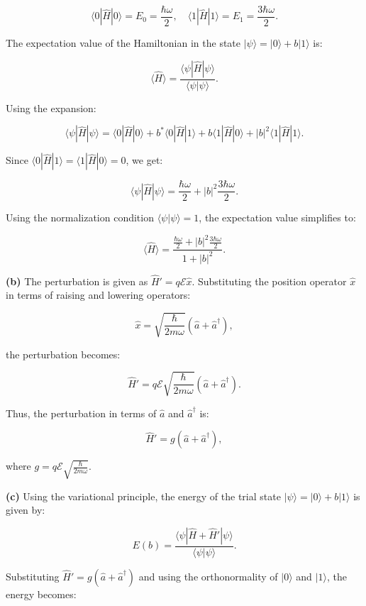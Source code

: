 \documentclass{article}
\begin{document}
\[
\langle 0 | \hat{H} | 0 \rangle = E_0 = \frac{\hbar \omega}{2}, \quad \langle 1 | \hat{H} | 1 \rangle = E_1 = \frac{3 \hbar \omega}{2}.
\]

The expectation value of the Hamiltonian in the state \(|\psi\rangle = |0\rangle + b|1\rangle\) is:

\[
\langle \hat{H} \rangle = \frac{\langle \psi | \hat{H} | \psi \rangle}{\langle \psi | \psi \rangle}.
\]

Using the expansion:

\[
\langle \psi | \hat{H} | \psi \rangle = \langle 0 | \hat{H} | 0 \rangle + b^* \langle 0 | \hat{H} | 1 \rangle + b \langle 1 | \hat{H} | 0 \rangle + |b|^2 \langle 1 | \hat{H} | 1 \rangle.
\]

Since \(\langle 0 | \hat{H} | 1 \rangle = \langle 1 | \hat{H} | 0 \rangle = 0\), we get:

\[
\langle \psi | \hat{H} | \psi \rangle = \frac{\hbar \omega}{2} + |b|^2 \frac{3 \hbar \omega}{2}.
\]

Using the normalization condition \(\langle \psi | \psi \rangle = 1\), the expectation value simplifies to:

\[
\langle \hat{H} \rangle = \frac{\frac{\hbar \omega}{2} + |b|^2 \frac{3 \hbar \omega}{2}}{1 + |b|^2}.
\]

\textbf{(b)} The perturbation is given as \(\hat{H}' = q \mathcal{E} \hat{x}\). Substituting the position operator \(\hat{x}\) in terms of raising and lowering operators:

\[
\hat{x} = \sqrt{\frac{\hbar}{2m\omega}} (\hat{a} + \hat{a}^\dagger),
\]

the perturbation becomes:

\[
\hat{H}' = q \mathcal{E} \sqrt{\frac{\hbar}{2m\omega}} (\hat{a} + \hat{a}^\dagger).
\]

Thus, the perturbation in terms of \(\hat{a}\) and \(\hat{a}^\dagger\) is:

\[
\hat{H}' = g (\hat{a} + \hat{a}^\dagger),
\]

where \(g = q \mathcal{E} \sqrt{\frac{\hbar}{2m\omega}}\).

\textbf{(c)} Using the variational principle, the energy of the trial state \(|\psi\rangle = |0\rangle + b|1\rangle\) is given by:

\[
E(b) = \frac{\langle \psi | \hat{H} + \hat{H}' | \psi \rangle}{\langle \psi | \psi \rangle}.
\]

Substituting \(\hat{H}' = g (\hat{a} + \hat{a}^\dagger)\) and using the orthonormality of \(|0\rangle\) and \(|1\rangle\), the energy becomes:
\end{document}
